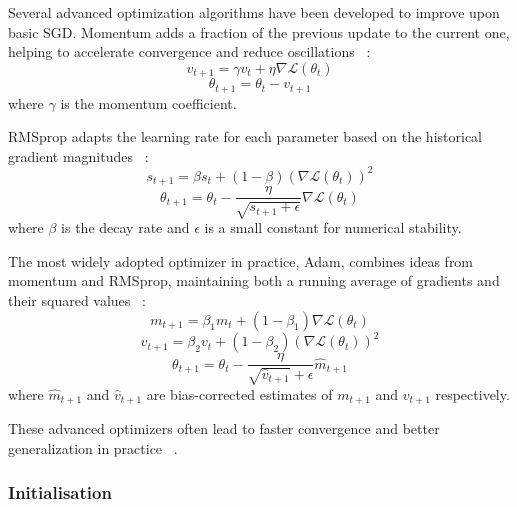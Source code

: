 \documentclass[a4paper, oneside]{discothesis}
\begin{document}
Several advanced optimization algorithms have been developed to improve upon basic SGD. Momentum adds a fraction of the previous update to the current one, helping to accelerate convergence and reduce oscillations ~\cite{sutskever2013importance}:
\begin{equation}
    v_{t+1} = \gamma v_t + \eta \nabla \mathcal{L}(\theta_t)
\end{equation}
\begin{equation}
    \theta_{t+1} = \theta_t - v_{t+1}
\end{equation}
where $\gamma$ is the momentum coefficient.

RMSprop adapts the learning rate for each parameter based on the historical gradient magnitudes ~\cite{tieleman2012lecture}:
\begin{equation}
    s_{t+1} = \beta s_t + (1-\beta)(\nabla \mathcal{L}(\theta_t))^2
\end{equation}
\begin{equation}
    \theta_{t+1} = \theta_t - \frac{\eta}{\sqrt{s_{t+1} + \epsilon}} \nabla \mathcal{L}(\theta_t)
\end{equation}
where $\beta$ is the decay rate and $\epsilon$ is a small constant for numerical stability.

The most widely adopted optimizer in practice, Adam, combines ideas from momentum and RMSprop, maintaining both a running average of gradients and their squared values ~\cite{kingma2014adam}:
\begin{equation}
    m_{t+1} = \beta_1 m_t + (1-\beta_1)\nabla \mathcal{L}(\theta_t)
\end{equation}
\begin{equation}
    v_{t+1} = \beta_2 v_t + (1-\beta_2)(\nabla \mathcal{L}(\theta_t))^2
\end{equation}
\begin{equation}
    \theta_{t+1} = \theta_t - \frac{\eta}{\sqrt{\hat{v}_{t+1}} + \epsilon} \hat{m}_{t+1}
\end{equation}
where $\hat{m}_{t+1}$ and $\hat{v}_{t+1}$ are bias-corrected estimates of $m_{t+1}$ and $v_{t+1}$ respectively.

These advanced optimizers often lead to faster convergence and better generalization in practice ~\cite{ruder2016overview}.

\subsubsection{Initialisation}
\end{document}
